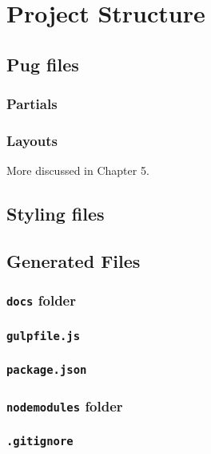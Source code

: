 \chapter{Project Structure}

\section{Pug files}

\subsection{Partials}

\subsection{Layouts}

More discussed in Chapter 5.

\section{Styling files}

\section{Generated Files}

\subsection{\texttt{docs} folder}

\subsection{\texttt{gulpfile.js}}

\subsection{\texttt{package.json}}

\subsection{\texttt{node\textunderscore modules} folder}

\subsection{\texttt{.gitignore}}

